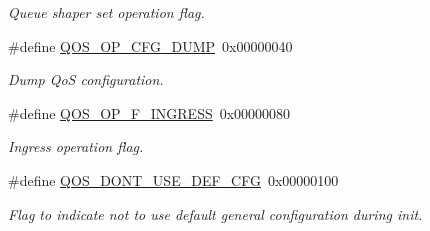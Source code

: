 \begin{DoxyCompactItemize}
\begin{DoxyCompactList}\small\item\em Queue shaper set operation flag. \end{DoxyCompactList}\item 
\hypertarget{group__FAPI__QOS__QUEUE_gac13ebe36678ac81af0ea00dd884329dc}{\#define \hyperlink{group__FAPI__QOS__QUEUE_gac13ebe36678ac81af0ea00dd884329dc}{Q\-O\-S\-\_\-\-O\-P\-\_\-\-C\-F\-G\-\_\-\-D\-U\-M\-P}~0x00000040}\label{group__FAPI__QOS__QUEUE_gac13ebe36678ac81af0ea00dd884329dc}

\begin{DoxyCompactList}\small\item\em Dump Qo\-S configuration. \end{DoxyCompactList}\item 
\hypertarget{group__FAPI__QOS__QUEUE_ga3a8cc13f32a00ba1434b36b48dcea721}{\#define \hyperlink{group__FAPI__QOS__QUEUE_ga3a8cc13f32a00ba1434b36b48dcea721}{Q\-O\-S\-\_\-\-O\-P\-\_\-\-F\-\_\-\-I\-N\-G\-R\-E\-S\-S}~0x00000080}\label{group__FAPI__QOS__QUEUE_ga3a8cc13f32a00ba1434b36b48dcea721}

\begin{DoxyCompactList}\small\item\em Ingress operation flag. \end{DoxyCompactList}\item 
\hypertarget{group__FAPI__QOS__QUEUE_ga9c63e4ccaf612b2a696c39cf976b195a}{\#define \hyperlink{group__FAPI__QOS__QUEUE_ga9c63e4ccaf612b2a696c39cf976b195a}{Q\-O\-S\-\_\-\-D\-O\-N\-T\-\_\-\-U\-S\-E\-\_\-\-D\-E\-F\-\_\-\-C\-F\-G}~0x00000100}\label{group__FAPI__QOS__QUEUE_ga9c63e4ccaf612b2a696c39cf976b195a}

\begin{DoxyCompactList}\small\item\em Flag to indicate not to use default general configuration during init. \end{DoxyCompactList}\end{DoxyCompactItemize}
